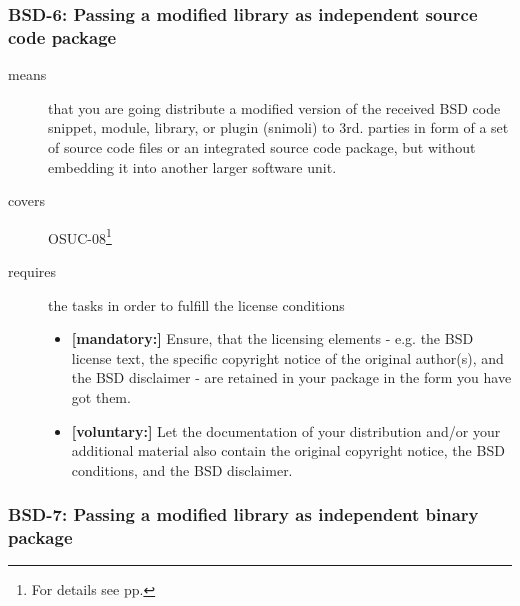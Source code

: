 \subsubsection{BSD-6: Passing a modified library as independent source code
package}
\label{OSUC-08-BSD}
\begin{description}
\item[means] that you are going distribute a modified version of the received
BSD code snippet, module, library, or plugin (snimoli) to 3rd. parties in form
of a set of source code files or an integrated source code package, but without
embedding it into another larger software unit.
\item[covers] OSUC-08\footnote{For details see pp. \pageref{OSUC-08-DEF}}
\item[requires] the tasks in order to fulfill the license conditions
\begin{itemize}
  \item \textbf{[mandatory:]} Ensure, that the licensing elements - e.g.
  the BSD license text, the specific copyright notice of the original author(s),
  and the BSD disclaimer - are retained in your package in the form you have got
  them.
  \item \textbf{[voluntary:]} Let the documentation of your distribution
  and/or your additional material also contain the original copyright notice, the
  BSD conditions, and the BSD disclaimer.
\end{itemize}
\end{description}


\subsubsection{BSD-7: Passing a modified library as independent binary
package}

